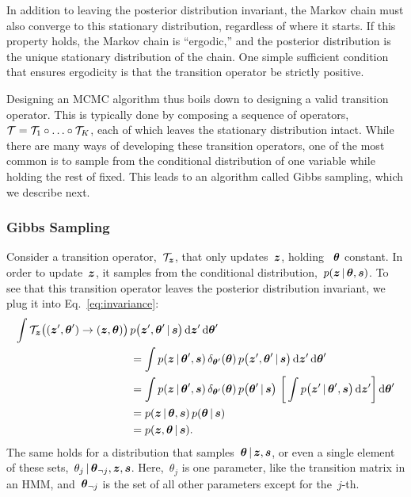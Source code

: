 In addition to leaving the posterior distribution invariant, the Markov 
chain must also converge to this stationary distribution, regardless 
of where it starts. If this property holds, the Markov chain is ``ergodic,''
and the posterior distribution is the unique stationary distribution of 
the chain. One simple sufficient condition that ensures ergodicity is 
that the transition operator be strictly positive. 

Designing an MCMC algorithm thus boils down to designing a valid
transition operator. This is typically done by composing a sequence of
operators,~${\mathcal{T} = \mathcal{T}_1 \circ \ldots \circ \mathcal{T}_K}$, each of which
leaves the stationary distribution intact. While there are many ways
of developing these transition operators, one of the most common 
is to sample from the conditional distribution of one variable 
while holding the rest of fixed. This leads to an algorithm called 
Gibbs sampling, which we describe next.

\subsubsection{Gibbs Sampling}
Consider a transition operator,~$\mathcal{T}_{\boldsymbol{z}}$, that only updates~$\boldsymbol{z}$,
holding ~$\boldsymbol{\theta}$ constant. In order to update~$\boldsymbol{z}$, it samples from
the conditional distribution,~$p(\boldsymbol{z} \,|\, \boldsymbol{\theta}, \boldsymbol{s})$. To see
that this transition operator leaves the posterior distribution
invariant, we plug it into Eq.~\ref{eq:invariance}:
\begin{align*}
  \int \mathcal{T}_{\boldsymbol{z}} \big((\boldsymbol{z}', \boldsymbol{\theta}') \to (\boldsymbol{z}, \boldsymbol{\theta}) \big) \, 
    &p \big(\boldsymbol{z}', \boldsymbol{\theta}' \,|\, \boldsymbol{s} \big) \, 
    \mathrm{d}\boldsymbol{z}' \, \mathrm{d}\boldsymbol{\theta}' \\
  &= \int p(\boldsymbol{z} \,|\, \boldsymbol{\theta}', \boldsymbol{s}) \, \delta_{\boldsymbol{\theta}'}(\boldsymbol{\theta}) \,
    p \big(\boldsymbol{z}', \boldsymbol{\theta}' \,|\, \boldsymbol{s} \big) \, 
    \mathrm{d}\boldsymbol{z}' \, \mathrm{d}\boldsymbol{\theta}' \\
  &= 
  \int p(\boldsymbol{z} \,|\, \boldsymbol{\theta}', \boldsymbol{s}) \, \delta_{\boldsymbol{\theta}'}(\boldsymbol{\theta}) \,
    p \big(\boldsymbol{\theta}' \,|\, \boldsymbol{s} \big) \,
    \left[ \, \int
    p \big(\boldsymbol{z}' \,|\, \boldsymbol{\theta}', \boldsymbol{s} \big) \, 
    \mathrm{d}\boldsymbol{z}'  \right] \mathrm{d}\boldsymbol{\theta}' \\
  &= p(\boldsymbol{z} \,|\, \boldsymbol{\theta}, \boldsymbol{s}) \, p(\boldsymbol{\theta} \,|\, \boldsymbol{s}) \\
  &= p(\boldsymbol{z}, \boldsymbol{\theta} \,|\, \boldsymbol{s}).
\end{align*}
The same holds for a distribution that
samples~${\boldsymbol{\theta} \,|\, \boldsymbol{z}, \boldsymbol{s}}$, or even a single element of these
sets,~${\theta_j \,|\, \boldsymbol{\theta}_{\neg j}, \boldsymbol{z}, \boldsymbol{s}}$.
Here,~$\theta_j$ is one parameter, like the transition matrix in an
HMM, and~$\boldsymbol{\theta}_{\neg j}$ is the set of all other parameters except
for the~$j$-th.

